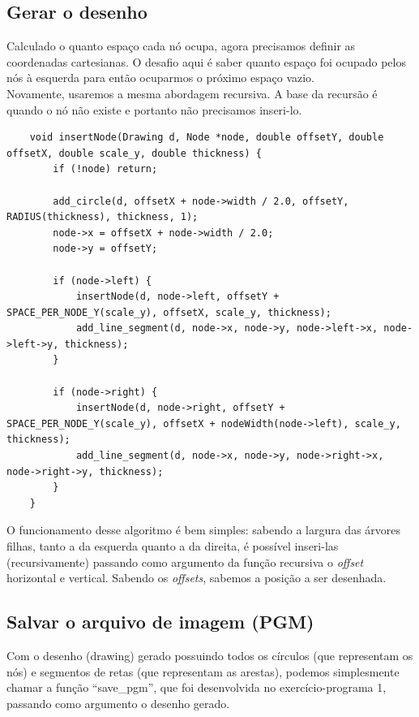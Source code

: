 \documentclass[12pt,a4paper]{article}
\begin{document}
	\subsection{Gerar o desenho}
	\indent Calculado o quanto espaço cada nó ocupa, agora precisamos definir as coordenadas cartesianas. O desafio aqui é saber quanto espaço foi ocupado pelos nós à esquerda para então ocuparmos o próximo espaço vazio.\\
	\indent Novamente, usaremos a mesma abordagem recursiva. A base da recursão é quando o nó não existe e portanto não precisamos inseri-lo.\\
	\begin{minipage}{\linewidth}
	\begin{lstlisting}
	void insertNode(Drawing d, Node *node, double offsetY, double offsetX, double scale_y, double thickness) {
		if (!node) return;

		add_circle(d, offsetX + node->width / 2.0, offsetY, RADIUS(thickness), thickness, 1);
		node->x = offsetX + node->width / 2.0;
		node->y = offsetY;

		if (node->left) {
			insertNode(d, node->left, offsetY + SPACE_PER_NODE_Y(scale_y), offsetX, scale_y, thickness);
			add_line_segment(d, node->x, node->y, node->left->x, node->left->y, thickness);
		}

		if (node->right) {
			insertNode(d, node->right, offsetY + SPACE_PER_NODE_Y(scale_y), offsetX + nodeWidth(node->left), scale_y, thickness);
			add_line_segment(d, node->x, node->y, node->right->x, node->right->y, thickness);
		}
	}
	\end{lstlisting}
	\end{minipage}	
	\indent O funcionamento desse algoritmo é bem simples: sabendo a largura das árvores filhas, tanto a da esquerda quanto a da direita, é possível inseri-las (recursivamente) passando como argumento da função recursiva o \textit{offset} horizontal e vertical. Sabendo os \textit{offsets}, sabemos a posição a ser desenhada.



	\subsection{Salvar o arquivo de imagem (PGM)}
	\indent Com o desenho (drawing) gerado possuindo todos os círculos (que representam os nós) e segmentos de retas (que representam as arestas), podemos simplesmente chamar a função “save\_pgm”, que foi desenvolvida no exercício-programa 1, passando como argumento o desenho gerado.
\end{document}
